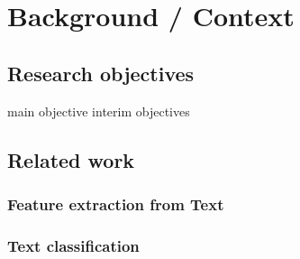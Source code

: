

\clearpage
\section{Background / Context}

\subsection{Research objectives}

main objective
interim objectives


\subsection{Related work}




\subsubsection{Feature extraction from Text}



\subsubsection{Text classification}
